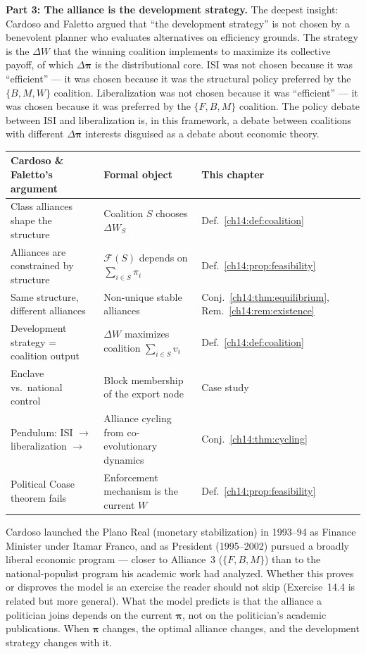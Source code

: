 \documentclass[../structural_economics_book.tex]{subfiles}
\begin{document}
\textbf{Part 3: The alliance is the development strategy.} The deepest insight: Cardoso and Faletto argued that ``the development strategy'' is not chosen by a benevolent planner who evaluates alternatives on efficiency grounds. The strategy is the $\Delta W$ that the winning coalition implements to maximize its collective payoff, of which $\Delta\boldsymbol{\pi}$ is the distributional core. ISI was not chosen because it was ``efficient'' --- it was chosen because it was the structural policy preferred by the $\{B, M, W\}$ coalition. Liberalization was not chosen because it was ``efficient'' --- it was chosen because it was preferred by the $\{F, B, M\}$ coalition. The policy debate between ISI and liberalization is, in this framework, a debate between coalitions with different $\Delta\boldsymbol{\pi}$ interests disguised as a debate about economic theory.

\begin{center}
\begin{tabularx}{\textwidth}{LLL}
\toprule
\textbf{Cardoso \& Faletto's argument} & \textbf{Formal object} & \textbf{This chapter} \\
\midrule
Class alliances shape the structure & Coalition $S$ chooses $\Delta W_S$ & Def.~\ref{ch14:def:coalition} \\
Alliances are constrained by structure & $\mathcal{F}(S)$ depends on $\sum_{i \in S} \pi_i$ & Def.~\ref{ch14:prop:feasibility} \\
Same structure, different alliances & Non-unique stable alliances & Conj.~\ref{ch14:thm:equilibrium}, Rem.~\ref{ch14:rem:existence} \\
Development strategy = coalition output & $\Delta W$ maximizes coalition $\sum_{i\in S} v_i$ & Def.~\ref{ch14:def:coalition} \\
Enclave vs.\ national control & Block membership of the export node & Case study \\
Pendulum: ISI $\to$ liberalization $\to$ & Alliance cycling from co-evolutionary dynamics & Conj.~\ref{ch14:thm:cycling} \\
Political Coase theorem fails & Enforcement mechanism is the current $W$ & Def.~\ref{ch14:prop:feasibility} \\
\bottomrule
\end{tabularx}
\end{center}

Cardoso launched the Plano Real (monetary stabilization) in 1993--94 as Finance Minister under Itamar Franco, and as President (1995--2002) pursued a broadly liberal economic program --- closer to Alliance~3 ($\{F, B, M\}$) than to the national-populist program his academic work had analyzed. Whether this proves or disproves the model is an exercise the reader should not skip (Exercise~14.4 is related but more general). What the model predicts is that the alliance a politician joins depends on the current $\boldsymbol{\pi}$, not on the politician's academic publications. When $\boldsymbol{\pi}$ changes, the optimal alliance changes, and the development strategy changes with it.
\end{document}
